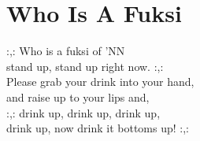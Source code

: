 \section{Who Is A Fuksi}
:,: Who is a fuksi of 'NN\\
stand up, stand up right now. :,:\\
Please grab your drink into your hand,\\
and raise up to your lips and,\\
:,: drink up, drink up, drink up,\\
drink up, now drink it bottoms up! :,: